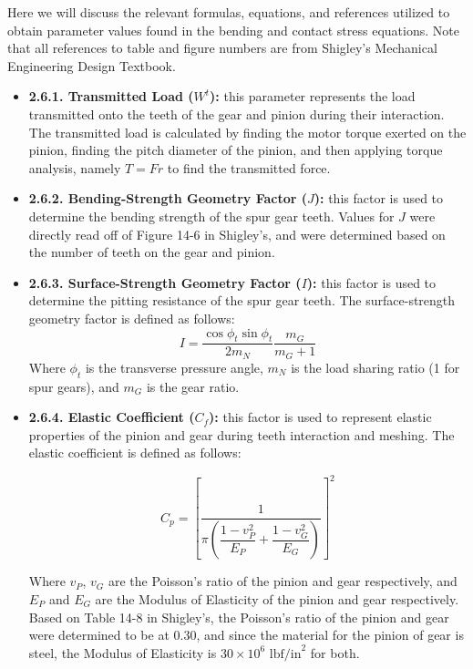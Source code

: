 \documentclass[letterpaper,12pt]{article}
\begin{document}
\noindent Here we will discuss the relevant formulas, equations, and references utilized to obtain parameter values found in the bending and contact stress equations. Note that all references to table and figure numbers are from Shigley's Mechanical Engineering Design Textbook.
\begin{itemize}[leftmargin=3mm]
    \item \textbf{2.6.1. Transmitted Load ($W^t$):} this parameter represents the load transmitted onto the teeth of the gear and pinion during their interaction. The transmitted load is calculated by finding the motor torque exerted on the pinion, finding the pitch diameter of the pinion, and then applying torque analysis, namely $T = Fr$ to find the transmitted force.
    
    \item \textbf{2.6.2. Bending-Strength Geometry Factor ($J$):} this factor is used to determine the bending strength of the spur gear teeth. Values for $J$ were directly read off of Figure 14-6 in Shigley's, and were determined based on the number of teeth on the gear and pinion.
    
    \item \textbf{2.6.3. Surface-Strength Geometry Factor ($I$):} this factor is used to determine the pitting resistance of the spur gear teeth. The surface-strength geometry factor is defined as follows:
    \begin{equation}
        I = \dfrac{\cos\phi_t \sin\phi_t}{2m_N} \dfrac{m_G}{m_G + 1}
    \end{equation}
    Where $\phi_t$ is the transverse pressure angle, $m_N$ is the load sharing ratio (1 for spur gears), and $m_G$ is the gear ratio.
    
    \item \textbf{2.6.4. Elastic Coefficient ($C_f$):} this factor is used to represent elastic properties of the pinion and gear during teeth interaction and meshing. The elastic coefficient is defined as follows:
    
    \begin{equation}
        C_p = \left[\dfrac{1}{\pi \left(\dfrac{1-v_P^2}{E_P} + \dfrac{1 - v_G^2}{E_G}\right)}\right]^2
    \end{equation}
    
    Where $v_P$, $v_G$ are the Poisson's ratio of the pinion and gear respectively, and $E_P$ and $E_G$ are the Modulus of Elasticity of the pinion and gear respectively. Based on Table 14-8 in Shigley's, the Poisson's ratio of the pinion and gear were determined to be at 0.30, and since the material for the pinion of gear is steel, the Modulus of Elasticity is $30 \times 10^6$ $\text{lbf/in}^2$ for both. 
    

\end{itemize}
\end{document}
